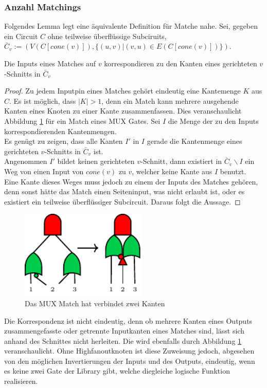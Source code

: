 \documentclass[11pt, a4paper, german]{article}
\begin{document}
\subsubsection{Anzahl Matchings}
\label{subsubsec:anzahl_matchings}
Folgendes Lemma legt eine äquivalente Definition für Matche nahe.
Sei, gegeben ein Circuit $C$ ohne teilweise überflüssige Subciruits, \\$\bar{C}_v := (V(C[cone(v)]), \{ (u,v) | (v,u) \in E(C[cone(v)])\})$. 
\begin{lemma}{Die Inputs eines Matches auf $v$ korrespondieren zu den Kanten eines gerichteten $v$-Schnitts in $\bar{C}_v $}
\end{lemma}
\begin{proof}
Zu jedem Inputpin eines Matches gehört eindeutig eine Kantemenge $K$ aus $C$. Es ist möglich, dass $|K| > 1$, denn ein Match kann mehrere ausgehende Kanten eines Knoten zu einer Kante zusammenfassen. Dies veranschaulicht Abbildung \ref{bild:mux_match} für ein Match eines MUX Gates.  Sei $I$ die Menge der zu den Inputs korrespondierenden Kantenmengen.\\
Es genügt zu zeigen, dass alle Kanten $I'$ in $I$ gerade die Kantenmenge eines gerichteten $v$-Schnitts in $\bar{C}_v$ ist. \\
Angenommen $I'$ bildet keinen gerichteten $v$-Schnitt, dann existiert in $\bar{C}_v\backslash I$ ein Weg von einen Input von $cone(v)$ zu $v$, welcher keine Kante aus $I$ benutzt. \\
Eine Kante dieses Weges muss jedoch zu einem der Inputs des Matches gehören, denn sonst hätte das Match einen Seiteninput, was nicht erlaubt ist, oder es existiert ein teilweise überflüssiger Subcircuit. Daraus folgt die Aussage. 
\end{proof}
\begin{figure}
		\includegraphics[width = 6cm]{pictures/compiled/mux_match}
		\caption{Das MUX Match hat verbindet zwei Kanten}
		\label{bild:mux_match}
\end{figure}
Die Korrespondenz ist nicht eindeutig, denn ob mehrere Kanten eines Outputs zusammengefasste oder getrennte Inputkanten eines Matches sind, lässt sich anhand des Schnittes nicht herleiten. Die wird ebenfalls durch Abbildung \ref{bild:mux_match} veranschaulicht. Ohne Highfanoutknoten ist diese Zuweisung jedoch, abgesehen von den möglichen Invertierungen der Inputs und des Outputs, eindeutig, wenn es keine zwei Gate der Library gibt, welche diegleiche  logische Funktion realisieren.\\
\end{document}
